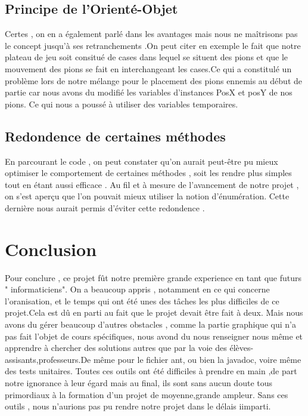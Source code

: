 \documentclass[10pt]{article}
\begin{document}
\subsection{Principe de l'Orienté-Objet} 
 Certes , on en a également parlé dans les avantages mais nous ne maîtrisons pas le concept jusqu'à ses retranchements .On peut citer en exemple le fait que notre plateau de jeu soit consitué de cases dans lequel se situent des pions et que le mouvement des pions se fait en interchangeant les cases.Ce qui a constitulé un problème lors de notre mélange pour le placement des pions ennemis au début de partie car nous avons du modifié les variables d'instances PosX et posY de nos pions. Ce qui nous a poussé à utiliser des variables temporaires.
\subsection{Redondence de certaines méthodes}
 En parcourant le code , on peut constater qu'on aurait peut-être pu mieux optimiser le comportement de certaines méthodes , soit les rendre plus simples tout en étant aussi efficace . Au fil et à mesure de l'avancement de notre projet , on s'est aperçu que l'on pouvait mieux utiliser la notion d'énumération. Cette dernière nous aurait permis d'éviter cette redondence .   
 
\section{Conclusion}

Pour conclure , ce projet fût notre première grande experience en tant que futurs " informaticiens". On a beaucoup appris , notamment en ce qui concerne l'oranisation, et le temps qui ont été unes des tâches les plus difficiles de ce projet.Cela est dû en parti au fait que le projet devait être fait à deux. Mais nous avons du gérer beaucoup d'autres obstacles , comme la partie graphique qui n'a pas fait l'objet de cours spécifiques, nous avond du nous renseigner nous même et apprendre à chercher des solutions autres que par la voie des élèves-assisants,professeurs.De même pour le fichier ant, ou bien la javadoc, voire même des tests unitaires. Toutes ces outils ont été difficiles à prendre en main ,de part notre ignorance à leur égard mais au final, ils sont sans aucun doute tous primordiaux à la formation d'un projet de moyenne,grande ampleur. Sans ces outils , nous n'aurions pas pu rendre notre projet dans le délais iimparti.
\end{document}
